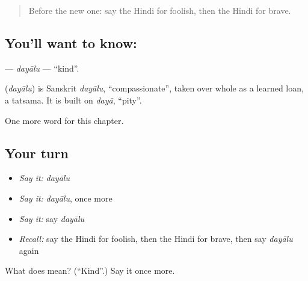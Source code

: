 \label{lesson:HI-C215-dayalu}



\begin{quote}
Before the new one: say the Hindi for foolish, then the Hindi for brave.
\end{quote}

\subsection*{You'll want to know: }
\textbf{} — \emph{dayālu} — \textquotedblleft{}kind\textquotedblright{}.

\begin{cousinweb}
\textbf{} (\emph{dayālu}) is Sanskrit \emph{dayālu}, \textquotedblleft{}compassionate\textquotedblright{}, taken over whole as a learned loan, a tatsama. It is built on \emph{dayā}, \textquotedblleft{}pity\textquotedblright{}.
\end{cousinweb}

\begin{grammarlens}[title={What you've built}]
One more word for this chapter.
\end{grammarlens}

\subsection*{Your turn}
\begin{itemize}
\raggedright
  \item \emph{Say it:} \emph{dayālu}
  \item \emph{Say it:} \emph{dayālu}, once more
  \item \emph{Say it:} say \emph{dayālu}
  \item \emph{Recall:} say the Hindi for foolish, then the Hindi for brave, then say \emph{dayālu} again
\end{itemize}

\begin{tcolorbox}[breakable,colback=teal!4,colframe=teal!35!black,title={Before you move on}]
What does  mean? (\textquotedblleft{}Kind\textquotedblright{}.) Say it once more.
\end{tcolorbox}
